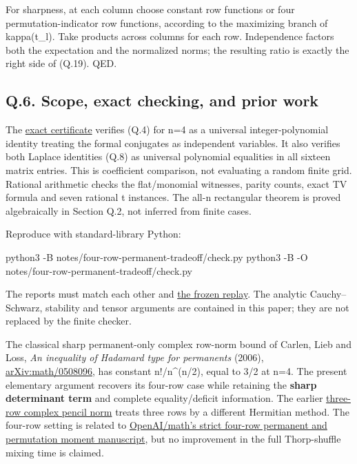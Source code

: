 \documentclass[
  11pt,
]{article}
\newenvironment{Shaded}{}{}
\newcommand{\AttributeTok}[1]{\textcolor[rgb]{0.49,0.56,0.16}{#1}}
\newcommand{\ExtensionTok}[1]{#1}
\newcommand{\NormalTok}[1]{#1}
\begin{document}
For sharpness, at each column choose constant row functions or four
permutation-indicator row functions, according to the maximizing branch
of kappa(t\_l). Take products across columns for each row. Independence
factors both the expectation and the normalized norms; the resulting
ratio is exactly the right side of (Q.19). QED.

\subsection{Q.6. Scope, exact checking, and prior
work}\label{q.6.-scope-exact-checking-and-prior-work}

The \href{../../notes/four-row-permanent-tradeoff/check.py}{exact
certificate} verifies (Q.4) for n=4 as a universal integer-polynomial
identity treating the formal conjugates as independent variables. It
also verifies both Laplace identities (Q.8) as universal polynomial
equalities in all sixteen matrix entries. This is coefficient
comparison, not evaluating a random finite grid. Rational arithmetic
checks the flat/monomial witnesses, parity counts, exact TV formula and
seven rational t instances. The all-n rectangular theorem is proved
algebraically in Section Q.2, not inferred from finite cases.

Reproduce with standard-library Python:

\begin{Shaded}
\begin{Highlighting}[]

\ExtensionTok{python3} \AttributeTok{{-}B}\NormalTok{ notes/four{-}row{-}permanent{-}tradeoff/check.py}
\ExtensionTok{python3} \AttributeTok{{-}B} \AttributeTok{{-}O}\NormalTok{ notes/four{-}row{-}permanent{-}tradeoff/check.py}
\end{Highlighting}
\end{Shaded}

The reports must match each other and
\href{../../notes/four-row-permanent-tradeoff/results/replay.txt}{the
frozen replay}. The analytic Cauchy--Schwarz, stability and tensor
arguments are contained in this paper; they are not replaced by the
finite checker.

The classical sharp permanent-only complex row-norm bound of Carlen,
Lieb and Loss, \emph{An inequality of Hadamard type for permanents}
(2006), \href{https://arxiv.org/abs/math/0508096}{arXiv:math/0508096},
has constant n!/n\^{}(n/2), equal to 3/2 at n=4. The present elementary
argument recovers its four-row case while retaining the \textbf{sharp
determinant term} and complete equality/deficit information. The earlier
\href{../../notes/complex-permanent-determinant/PAPER.md}{three-row
complex pencil norm} treats three rows by a different Hermitian method.
The four-row setting is related to
\href{https://github.com/openai/math/blob/main/preprints/A-strict-four-row-permanent-inequality-and-permutation-moments-September-26-2026/build/sections/02-permanent.tex}{OpenAI/math's
strict four-row permanent and permutation moment manuscript}, but no
improvement in the full Thorp-shuffle mixing time is claimed.
\end{document}
